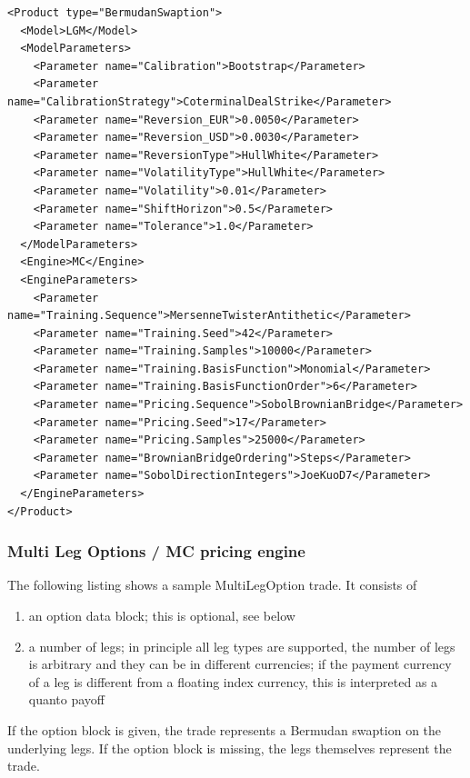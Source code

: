 \begin{verbatim}
<Product type="BermudanSwaption">
  <Model>LGM</Model>
  <ModelParameters>
    <Parameter name="Calibration">Bootstrap</Parameter>
    <Parameter name="CalibrationStrategy">CoterminalDealStrike</Parameter>
    <Parameter name="Reversion_EUR">0.0050</Parameter>
    <Parameter name="Reversion_USD">0.0030</Parameter>
    <Parameter name="ReversionType">HullWhite</Parameter>
    <Parameter name="VolatilityType">HullWhite</Parameter>
    <Parameter name="Volatility">0.01</Parameter>
    <Parameter name="ShiftHorizon">0.5</Parameter>
    <Parameter name="Tolerance">1.0</Parameter>
  </ModelParameters>
  <Engine>MC</Engine>
  <EngineParameters>
    <Parameter name="Training.Sequence">MersenneTwisterAntithetic</Parameter>
    <Parameter name="Training.Seed">42</Parameter>
    <Parameter name="Training.Samples">10000</Parameter>
    <Parameter name="Training.BasisFunction">Monomial</Parameter>
    <Parameter name="Training.BasisFunctionOrder">6</Parameter>
    <Parameter name="Pricing.Sequence">SobolBrownianBridge</Parameter>
    <Parameter name="Pricing.Seed">17</Parameter>
    <Parameter name="Pricing.Samples">25000</Parameter>
    <Parameter name="BrownianBridgeOrdering">Steps</Parameter>
    <Parameter name="SobolDirectionIntegers">JoeKuoD7</Parameter>
  </EngineParameters>
</Product>
\end{verbatim}

\subsubsection*{Multi Leg Options / MC pricing engine}

The following listing shows a sample MultiLegOption trade. It consists of

\begin{enumerate}
\item an option data block; this is optional, see below
\item a number of legs; in principle all leg types are supported, the number of legs is arbitrary and they can be in
  different currencies; if the payment currency of a leg is different from a floating index currency, this is
  interpreted as a quanto payoff
\end{enumerate}

If the option block is given, the trade represents a Bermudan swaption on the underlying legs. If the option block is
missing, the legs themselves represent the trade.

